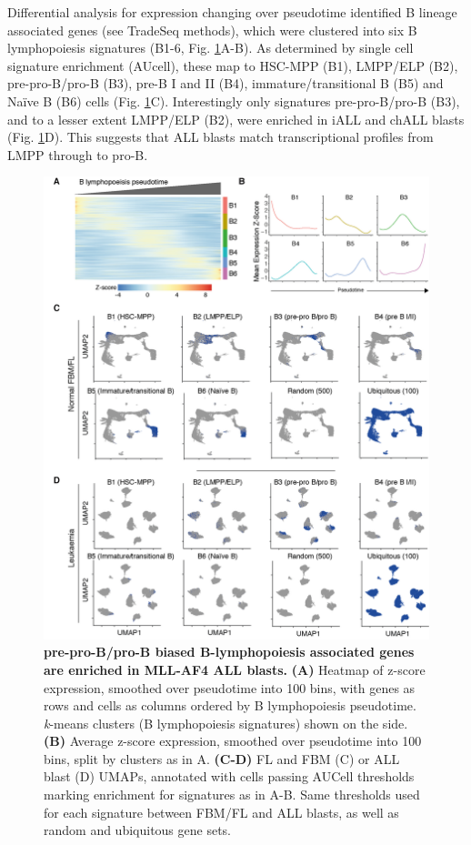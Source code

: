 Differential analysis for expression changing over pseudotime identified B lineage associated genes (see TradeSeq methods), which were clustered into six B lymphopoiesis signatures (B1-6, Fig. \ref{fig:ch4_multiome-tradeseq}A-B). As determined by single cell signature enrichment (AUcell), these map to HSC-MPP (B1), LMPP/ELP (B2), pre-pro-B/pro-B (B3), pre-B I and II (B4), immature/transitional B (B5) and Na\"{i}ve B (B6) cells (Fig. \ref{fig:ch4_multiome-tradeseq}C). Interestingly only signatures pre-pro-B/pro-B (B3), and to a lesser extent LMPP/ELP (B2), were enriched in iALL and chALL blasts (Fig. \ref{fig:ch4_multiome-tradeseq}D). This suggests that ALL blasts match transcriptional profiles from LMPP through to pro-B.

\begin{figure}[htbp]
    \centering
    \includegraphics[width=\textwidth,height=\textheight,keepaspectratio]{figures/chapter4/ch4_multiome-tradeseq.png}
    \caption[{pre-pro-B/pro-B biased B-lymphopoiesis associated genes are enriched in MLL-AF4 ALL blasts.}]
    {\textbf{pre-pro-B/pro-B biased B-lymphopoiesis associated genes are enriched in MLL-AF4 ALL blasts.} 
    \textbf{(A)} Heatmap of z-score expression, smoothed over pseudotime into 100 bins, with genes as rows and cells as columns ordered by B lymphopoiesis pseudotime. \textit{k}-means clusters (B lymphopoiesis signatures) shown on the side.
    \textbf{(B)} Average z-score expression, smoothed over pseudotime into 100 bins, split by clusters as in A.
    \textbf{(C-D)} FL and FBM (C) or ALL blast (D) UMAPs, annotated with cells passing AUCell thresholds marking enrichment for signatures as in A-B. Same thresholds used for each signature between FBM/FL and ALL blasts, as well as random and ubiquitous gene sets.
    }
    \label{fig:ch4_multiome-tradeseq}
\end{figure}

